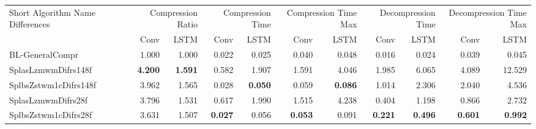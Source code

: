 \begin{tabular}{lrrrrrrrrrr}
\toprule
\multicolumn{1}{p{2.5cm}}{Short Algorithm Name Differences} & \multicolumn{2}{p{1.8cm}}{Compression Ratio} & \multicolumn{2}{p{1.8cm}}{Compression Time} & \multicolumn{2}{p{1.8cm}}{Compression Time Max} & \multicolumn{2}{p{1.8cm}}{Decompression Time} & \multicolumn{2}{p{1.8cm}}{Decompression Time Max} \\
 & Conv & LSTM & Conv & LSTM & Conv & LSTM & Conv & LSTM & Conv & LSTM \\
\midrule
BL-GeneralCompr & 1.000 & 1.000 & 0.022 & 0.025 & 0.040 & 0.048 & 0.016 & 0.024 & 0.039 & 0.045 \\
SplasLzmwmDifrs148f & \bfseries 4.200 & \bfseries 1.591 & 0.582 & 1.907 & 1.591 & 4.046 & 1.985 & 6.065 & 4.089 & 12.529 \\
SplbsZstwm1cDifrs148f & 3.962 & 1.565 & 0.028 & \bfseries 0.050 & 0.059 & \bfseries 0.086 & 1.014 & 2.306 & 2.040 & 4.536 \\
SplasLzmwmDifrs28f & 3.796 & 1.531 & 0.617 & 1.990 & 1.515 & 4.238 & 0.404 & 1.198 & 0.866 & 2.732 \\
SplbsZstwm1cDifrs28f & 3.631 & 1.507 & \bfseries 0.027 & 0.056 & \bfseries 0.053 & 0.091 & \bfseries 0.221 & \bfseries 0.496 & \bfseries 0.601 & \bfseries 0.992 \\
\bottomrule
\end{tabular}
